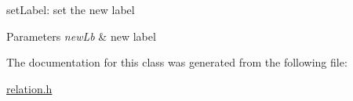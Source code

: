 set\+Label\+: set the new label 


\begin{DoxyParams}{Parameters}
{\em new\+Lb} & new label \\
\hline
\end{DoxyParams}


The documentation for this class was generated from the following file\+:\begin{DoxyCompactItemize}
\item 
\hyperlink{relation_8h}{relation.\+h}\end{DoxyCompactItemize}
